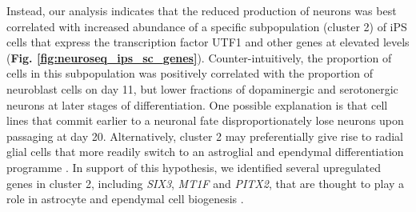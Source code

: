 Instead, our analysis indicates that the reduced production of neurons was best correlated with increased abundance of a specific subpopulation (cluster 2) of iPS cells that express the transcription factor UTF1 and other genes at elevated levels (\textbf{Fig. \ref{fig:neuroseq_ips_sc_genes}}).
Counter-intuitively, the proportion of cells in this subpopulation was positively correlated with the proportion of neuroblast cells on day 11, but lower fractions of dopaminergic and serotonergic neurons at later stages of differentiation. 
One possible explanation is that cell lines that commit earlier to a neuronal fate disproportionately lose neurons upon passaging at day 20.
Alternatively, cluster 2 may preferentially give rise to radial glial cells that more readily switch to an astroglial and ependymal differentiation programme \cite{spassky2005adult}. 
In support of this hypothesis, we identified several upregulated genes in cluster 2, including \textit{SIX3}, \textit{MT1F} and \textit{PITX2}, that are thought to play a role in astrocyte and ependymal cell biogenesis \cite{lavado2011six3, michael2011up, jacquet2009foxj1}. \\




